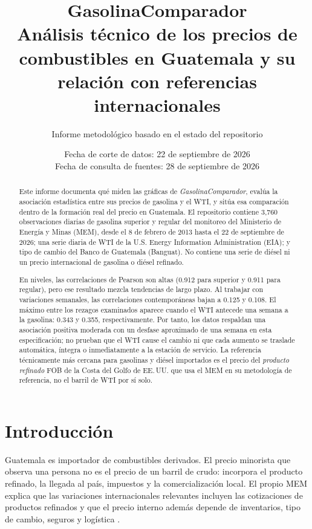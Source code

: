 \documentclass[11pt,letterpaper]{article}
\title{\textbf{GasolinaComparador}\\[0.35cm]\Large Análisis técnico de los precios de combustibles en Guatemala y su relación con referencias internacionales}
\author{Informe metodológico basado en el estado del repositorio}
\date{Fecha de corte de datos: 22 de septiembre de 2026\\Fecha de consulta de fuentes: 28 de septiembre de 2026}
\begin{document}
\maketitle
\thispagestyle{empty}

\begin{abstract}
Este informe documenta qué miden las gráficas de \emph{GasolinaComparador}, evalúa la asociación estadística entre sus precios de gasolina y el WTI, y sitúa esa comparación dentro de la formación real del precio en Guatemala. El repositorio contiene 3,760 observaciones diarias de gasolina superior y regular del monitoreo del Ministerio de Energía y Minas (MEM), desde el 8 de febrero de 2013 hasta el 22 de septiembre de 2026; una serie diaria de WTI de la U.S. Energy Information Administration (EIA); y tipo de cambio del Banco de Guatemala (Banguat). No contiene una serie de diésel ni un precio internacional de gasolina o diésel refinado.

En niveles, las correlaciones de Pearson son altas (0.912 para superior y 0.911 para regular), pero ese resultado mezcla tendencias de largo plazo. Al trabajar con variaciones semanales, las correlaciones contemporáneas bajan a 0.125 y 0.108. El máximo entre los rezagos examinados aparece cuando el WTI antecede una semana a la gasolina: 0.343 y 0.355, respectivamente. Por tanto, los datos respaldan una asociación positiva moderada con un desfase aproximado de una semana en esta especificación; no prueban que el WTI cause el cambio ni que cada aumento se traslade automática, íntegra o inmediatamente a la estación de servicio. La referencia técnicamente más cercana para gasolinas y diésel importados es el precio del \emph{producto refinado} FOB de la Costa del Golfo de EE.\,UU. que usa el MEM en su metodología de referencia, no el barril de WTI por sí solo.
\end{abstract}

\newpage
\tableofcontents
\newpage

\section{Introducción}
Guatemala es importador de combustibles derivados. El precio minorista que observa una persona no es el precio de un barril de crudo: incorpora el producto refinado, la llegada al país, impuestos y la comercialización local. El propio MEM explica que las variaciones internacionales relevantes incluyen las cotizaciones de productos refinados y que el precio interno además depende de inventarios, tipo de cambio, seguros y logística \parencite{memSeguimiento2026,memDeterminacion2021}.
\end{document}
